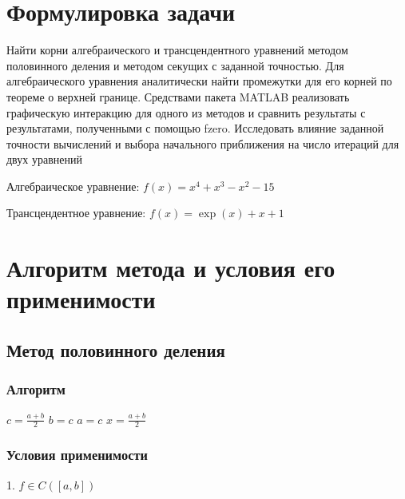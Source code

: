 






\section{Формулировка задачи}

Найти корни алгебраического и трансцендентного уравнений методом половинного деления и методом секущих с заданной точностью. Для алгебраического уравнения аналитически найти промежутки для его корней по теореме о верхней границе. Средствами пакета MATLAB реализовать графическую интеракцию для одного из методов и сравнить результаты с результатами, полученными с помощью fzero. Исследовать влияние заданной точности вычислений и выбора начального приближения на число итераций для двух уравнений

Алгебраическое уравнение: \begin{math} 
   f(x)=x^{4}+x^{3}-x^{2}-15
   \end {math}

Трансцендентное уравнение: \begin{math} 
	f(x)= \exp(x)+x+1
	\end {math}

\section{Алгоритм метода и условия его применимости}
\subsection {Метод половинного деления}
\subsubsection {Алгоритм}
\begin{algorithmic}
	
	\State $c=\frac{a+b}2 $
	\State $b=c$
	\Else
	\State $a=c$
	\EndIf
	\EndWhile
	\State $x=\frac{a+b}2 $
	
\end{algorithmic}
\subsubsection {Условия применимости}
1. \begin{math}
f\in C([a,b])
\end{math}

